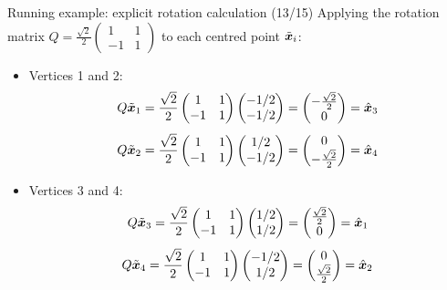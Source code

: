 \documentclass[aspectratio=169]{beamer}\usepackage[]{graphicx}\usepackage[]{xcolor}
\begin{document}
\begin{frame}{Running example: explicit rotation calculation (13/15)}
Applying the rotation matrix $Q = \frac{\sqrt{2}}{2}\begin{pmatrix} 1 & 1 \\ -1 & 1 \end{pmatrix}$ to each centred point $\tilde{\bm{x}}_i$:
\vfill
\begin{itemize}
\item Vertices 1 and 2:
\[
Q\tilde{\bm{x}}_1 = \frac{\sqrt{2}}{2}\begin{pmatrix} 1 & 1 \\ -1 & 1 \end{pmatrix}\begin{pmatrix} -1/2 \\ -1/2 \end{pmatrix} = \begin{pmatrix} -\frac{\sqrt{2}}{2} \\ 0 \end{pmatrix} = \hat{\bm{x}}_3
\]
\[
Q\tilde{\bm{x}}_2 = \frac{\sqrt{2}}{2}\begin{pmatrix} 1 & 1 \\ -1 & 1 \end{pmatrix}\begin{pmatrix} 1/2 \\ -1/2 \end{pmatrix} = \begin{pmatrix} 0 \\ -\frac{\sqrt{2}}{2} \end{pmatrix} = \hat{\bm{x}}_4
\]
\vfill
\item Vertices 3 and 4:
\[
Q\tilde{\bm{x}}_3 = \frac{\sqrt{2}}{2}\begin{pmatrix} 1 & 1 \\ -1 & 1 \end{pmatrix}\begin{pmatrix} 1/2 \\ 1/2 \end{pmatrix} = \begin{pmatrix} \frac{\sqrt{2}}{2} \\ 0 \end{pmatrix} = \hat{\bm{x}}_1
\]
\[
Q\tilde{\bm{x}}_4 = \frac{\sqrt{2}}{2}\begin{pmatrix} 1 & 1 \\ -1 & 1 \end{pmatrix}\begin{pmatrix} -1/2 \\ 1/2 \end{pmatrix} = \begin{pmatrix} 0 \\ \frac{\sqrt{2}}{2} \end{pmatrix} = \hat{\bm{x}}_2
\]
\end{itemize}
\end{frame}
\end{document}
